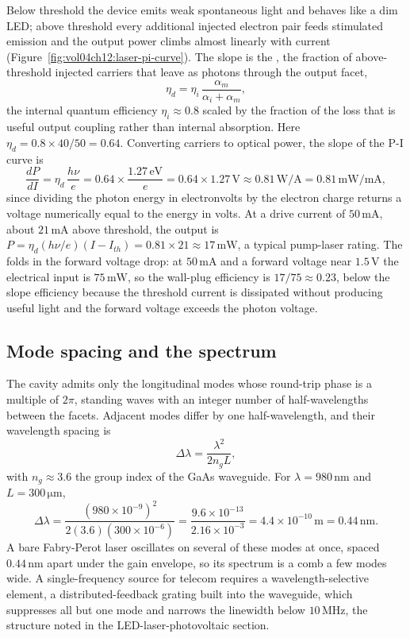 Below threshold the device emits weak spontaneous light and behaves like
a dim LED; above threshold every additional injected electron pair feeds
stimulated emission and the output power climbs almost linearly with
current (Figure~\ref{fig:vol04ch12:laser-pi-curve}). The slope is the
, the fraction of above-threshold
injected carriers that leave as photons through the output facet,
\[
\eta_d = \eta_i\,\frac{\alpha_m}{\alpha_i + \alpha_m},
\]
the internal quantum efficiency $\eta_i \approx 0.8$ scaled by the
fraction of the loss that is useful output coupling rather than internal
absorption. Here $\eta_d = 0.8\times 40/50 = 0.64$. Converting carriers
to optical power, the slope of the P-I curve is
\[
\frac{dP}{dI} = \eta_d\,\frac{h\nu}{e}
              = 0.64\times\frac{1.27\,\si{\electronvolt}}{e}
              = 0.64\times 1.27\,\si{\volt}
              \approx 0.81\,\si{\watt\per\ampere}
              = 0.81\,\si{\milli\watt\per\milli\ampere},
\]
since dividing the photon energy in electronvolts by the electron charge
returns a voltage numerically equal to the energy in volts. At a drive
current of $50\,\si{\milli\ampere}$, about $21\,\si{\milli\ampere}$ above
threshold, the output is $P = \eta_d (h\nu/e)(I - I_{th}) = 0.81\times
21 \approx 17\,\si{\milli\watt}$, a typical pump-laser rating. The
 folds in the forward voltage drop: at
$50\,\si{\milli\ampere}$ and a forward voltage near $1.5\,\si{\volt}$
the electrical input is $75\,\si{\milli\watt}$, so the wall-plug
efficiency is $17/75 \approx 0.23$, below the slope efficiency because
the threshold current is dissipated without producing useful light and
the forward voltage exceeds the photon voltage.

\subsection{Mode spacing and the spectrum}

The cavity admits only the longitudinal modes whose round-trip phase is
a multiple of $2\pi$, standing waves with an integer number of
half-wavelengths between the facets. Adjacent modes differ by one
half-wavelength, and their wavelength spacing is
\[
\Delta\lambda = \frac{\lambda^{2}}{2 n_g L},
\]
with $n_g \approx 3.6$ the group index of the GaAs waveguide. For
$\lambda = 980\,\si{\nano\meter}$ and $L = 300\,\si{\micro\meter}$,
\[
\Delta\lambda = \frac{(980\times 10^{-9})^{2}}
                     {2(3.6)(300\times 10^{-6})}
             = \frac{9.6\times 10^{-13}}{2.16\times 10^{-3}}
             = 4.4\times 10^{-10}\,\si{\meter}
             = 0.44\,\si{\nano\meter}.
\]
A bare Fabry-Perot laser oscillates on several of these modes at once,
spaced $0.44\,\si{\nano\meter}$ apart under the gain envelope, so its
spectrum is a comb a few modes wide. A single-frequency source for
telecom requires a wavelength-selective element, a distributed-feedback
grating built into the waveguide, which suppresses all but one mode and
narrows the linewidth below $10\,\si{\mega\hertz}$, the structure noted
in the LED-laser-photovoltaic section.

